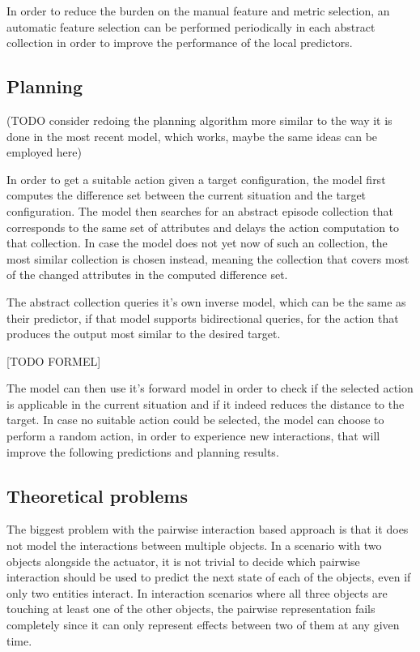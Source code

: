 In order to reduce the burden on the manual feature and metric selection, an 
automatic feature selection can be performed periodically in each abstract 
collection in order to improve the performance of the local predictors. %

\subsection{Planning}
(TODO consider redoing the planning algorithm more similar to the way it is done
in the most recent model, which works, maybe the same ideas can be employed 
here)

In order to get a suitable action given a target configuration, the model first computes the 
difference set between the current situation and the target 
configuration. The model then searches for an abstract episode collection that 
corresponds to the same set of attributes and delays the action computation to 
that collection. In case the model does not yet now of such an collection, the 
most similar collection is chosen instead, meaning the collection that covers 
most of the changed attributes in the computed difference set. 

The abstract collection queries it's own inverse model, which can be the same 
as their predictor, if that model supports bidirectional queries, for the 
action that produces the output most similar to the desired target. 

[TODO FORMEL] %

The model can then use it's forward model in order to check if the selected 
action is applicable in the current situation and if it indeed reduces the 
distance to the target. In case no suitable action could be selected, the model 
can choose to perform a random action, in order to experience new interactions, 
that will improve the following predictions and planning results.


\subsection{Theoretical problems}

The biggest problem with the pairwise interaction based approach is that it 
does not model the interactions between multiple objects. In a scenario with 
two objects alongside the actuator, it is not trivial to decide which pairwise 
interaction should be used to predict the next state of each of the objects, 
even if only two entities interact. In interaction scenarios where all three 
objects are touching at least one of the other objects, the pairwise 
representation fails completely since it can only represent effects between two 
of them at any given time. 

